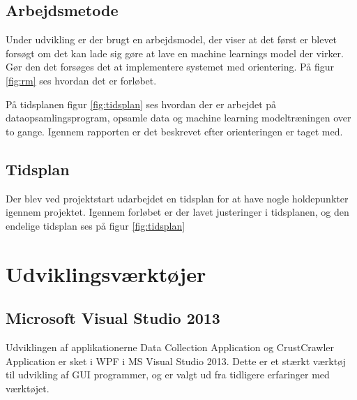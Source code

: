 \subsection{Arbejdsmetode}
Under udvikling er der brugt en arbejdsmodel, der viser at det først er blevet forsøgt om det kan lade sig gøre at lave en machine learnings model der virker. Gør den det forsøges det at implementere systemet med orientering. På figur \ref{fig:rm} ses hvordan det er forløbet.


På tidsplanen figur \ref{fig:tidsplan} ses hvordan der er arbejdet på dataopsamlingsprogram, opsamle data og machine learning modeltræningen over to gange. Igennem rapporten er det beskrevet efter orienteringen er taget med.


\subsection{Tidsplan}
\label{sec:tidsplan}
Der blev ved projektstart udarbejdet en tidsplan for at have nogle holdepunkter igennem projektet. Igennem forløbet er der lavet justeringer i tidsplanen, og den endelige tidsplan ses på figur \ref{fig:tidsplan}


\section{Udviklingsværktøjer}
\label{sec:Udviklingsvaerktojer}

\subsection*{Microsoft Visual Studio 2013}
Udviklingen af applikationerne Data Collection Application og CrustCrawler Application er sket i WPF i MS Visual Studio 2013. Dette er et stærkt værktøj til udvikling af GUI programmer, og er valgt ud fra tidligere erfaringer med værktøjet.

